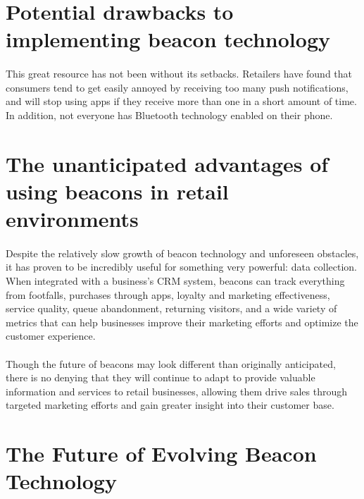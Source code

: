 \documentclass[a4paper,12pt]{report}
\begin{document}
\section{Potential drawbacks to implementing beacon technology}
\paragraph{}This great resource has not been without its setbacks. Retailers have found that consumers tend to get easily annoyed by receiving too many push notifications, and will stop using apps if they receive more than one in a short amount of time. In addition, not everyone has Bluetooth technology enabled on their phone.
\section{The unanticipated advantages of using beacons in retail environments}
\paragraph{}Despite the relatively slow growth of beacon technology and unforeseen obstacles, it has proven to be incredibly useful for something very powerful: data collection. When integrated with a business’s CRM system, beacons can track everything from footfalls, purchases through apps, loyalty and marketing effectiveness, service quality, queue abandonment, returning visitors, and a wide variety of metrics that can help businesses improve their marketing efforts and optimize the customer experience.
\paragraph{}Though the future of beacons may look different than originally anticipated, there is no denying that they will continue to adapt to provide valuable information and services to retail businesses, allowing them drive sales through targeted marketing efforts and gain greater insight into their customer base.
\section{The Future of Evolving Beacon Technology}
\end{document}
